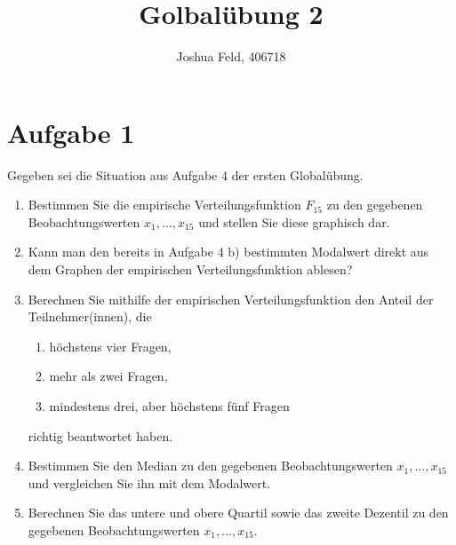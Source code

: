 \documentclass{exercise}
\institute{Institut für Statistik und Wirtschaftsmathematik}
\title{Golbalübung 2}
\author{Joshua Feld, 406718}
\begin{document}
    \maketitle


    \section*{Aufgabe 1}

    \begin{problem}
        Gegeben sei die Situation aus Aufgabe 4 der ersten Globalübung.
        \begin{enumerate}
            \item Bestimmen Sie die empirische Verteilungsfunktion \(F_{15}\) zu den gegebenen Beobachtungswerten \(x_1, \ldots, x_{15}\) und stellen Sie diese graphisch dar.
            \item Kann man den bereits in Aufgabe 4 b) bestimmten Modalwert direkt aus dem Graphen der empirischen Verteilungsfunktion ablesen?
            \item Berechnen Sie mithilfe der empirischen Verteilungsfunktion den Anteil der Teilnehmer(innen), die
            \begin{enumerate}
                \item höchstens vier Fragen,
                \item mehr als zwei Fragen,
                \item mindestens drei, aber höchstens fünf Fragen
            \end{enumerate}
            richtig beantwortet haben.
            \item Bestimmen Sie den Median zu den gegebenen Beobachtungswerten \(x_1, \ldots, x_{15}\) und vergleichen Sie ihn mit dem Modalwert.
            \item Berechnen Sie das untere und obere Quartil sowie das zweite Dezentil zu den gegebenen Beobachtungswerten \(x_1, \ldots, x_{15}\).
        \end{enumerate}
    \end{problem}
\end{document}
